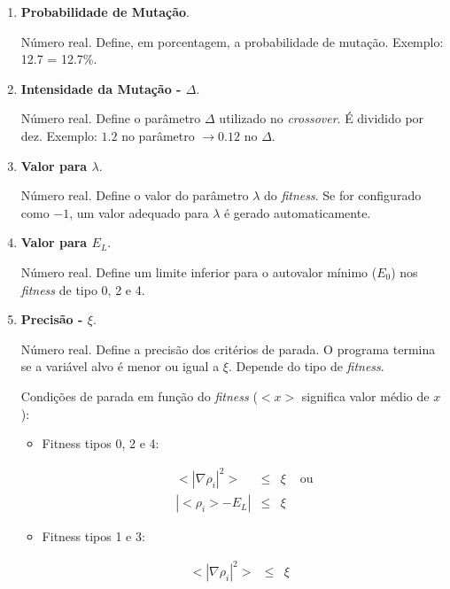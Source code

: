 \begin{enumerate}
		\item \textbf{Probabilidade de Mutação}.
		
		Número real. Define, em porcentagem, a probabilidade de mutação. Exemplo: 12.7 = 12.7\%.
		
		\item \textbf{Intensidade da Mutação - $\Delta$}.
		
			Número real. Define o parâmetro $\Delta$ utilizado no \emph{crossover}. É dividido por dez. Exemplo: $1.2$ no parâmetro $\rightarrow 0.12$ no $\Delta$.
		
		\item \textbf{Valor para $\lambda$}.
		
		Número real. Define o valor do parâmetro $\lambda$ do \emph{fitness}. Se for configurado como $-1$, um valor adequado para $\lambda$ é gerado automaticamente.
		
		\item \textbf{Valor para $E_L$}.
		
		Número real. Define um limite inferior para o autovalor mínimo ($E_0$) nos \emph{fitness} de tipo 0, 2 e 4. 
		
		\item \textbf{Precisão - $\xi$}.
		
		Número real. Define a precisão dos critérios de parada. O programa termina se a variável alvo é menor ou igual a $\xi$. Depende do tipo de \emph{fitness}.
		
		Condições de parada em função do \emph{fitness} ($<x>$ significa valor médio de $x$):
				
		\begin{itemize}
			\item Fitness tipos 0, 2 e 4:
			
			\begin{equation}
				\begin{array}{ccll}
				<|\nabla \rho_i|^2> & \leq & \xi & \mbox{  ou} \\
				| <\rho_i> - E_L | & \leq & \xi &
				\end{array}
			\end{equation}
			
			
			\item Fitness tipos 1 e 3:
			
			\begin{equation}
				\begin{array}{ccll}
					<|\nabla \rho_i|^2> & \leq & \xi &
				\end{array}
			\end{equation}
			

\end{itemize}
\end{enumerate}
